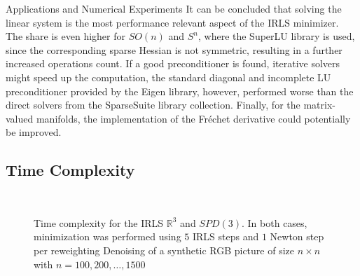 \begin{chapter}{Applications and Numerical Experiments}
It can be concluded that solving the linear system is the most performance relevant aspect of the IRLS minimizer. The share is even higher for $SO(n)$ and $S^n$, where the SuperLU library is used, 
since the corresponding sparse Hessian is not symmetric, resulting in a further increased operations count. If a good preconditioner is found, iterative solvers might speed up the computation, 
the standard diagonal and incomplete LU preconditioner provided by the Eigen library, however, performed worse than the direct solvers from the SparseSuite library collection. Finally, for
the matrix-valued manifolds, the implementation of the Fr\'{e}chet derivative could potentially be improved.

\subsection{Time Complexity}
\label{sub:TimeComplexity}
\begin{figure}[h!]
    \centering
    \\
    \caption[Time complexity IRLS $\mathbb{R}^3$ and $SPD(3)$]{Time complexity for the IRLS $\mathbb{R}^3$ and $SPD(3)$. In both cases, minimization was performed using $5$ IRLS steps and $1$ Newton step per
    reweighting
	 Denoising of a synthetic RGB picture of size $n\times n$ with $n=100, 200, \ldots, 1500$
}
\end{figure}
\end{chapter}
